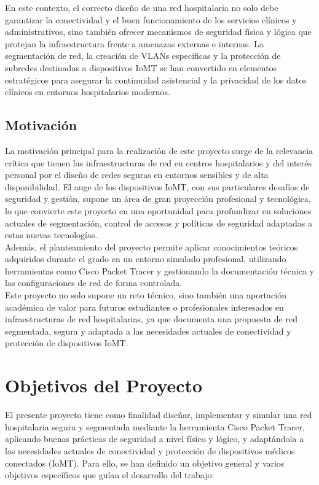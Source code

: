 En este contexto, el correcto diseño de una red hospitalaria no solo debe garantizar la conectividad y el buen funcionamiento de los servicios clínicos y administrativos, 
sino también ofrecer mecanismos de seguridad física y lógica que protejan la infraestructura frente a amenazas externas e internas. La segmentación de red, la creación de 
\ac{VLAN}s específicas y la protección de subredes destinadas a dispositivos IoMT se han convertido en elementos estratégicos para asegurar la continuidad asistencial y la 
privacidad de los datos clínicos en entornos hospitalarios modernos.

\subsection{Motivación}
La motivación principal para la realización de este proyecto surge de la relevancia crítica que tienen las infraestructuras de red en centros 
hospitalarios y del interés personal por el diseño de redes seguras en entornos sensibles y de alta disponibilidad. El auge de los dispositivos IoMT, con sus particulares 
desafíos de seguridad y gestión, supone un área de gran proyección profesional y tecnológica, lo que convierte este proyecto en una oportunidad para profundizar en soluciones 
actuales de segmentación, control de accesos y políticas de seguridad adaptadas a estas nuevas tecnologías. \\

Además, el planteamiento del proyecto permite aplicar conocimientos teóricos adquiridos durante el grado en un entorno simulado profesional, utilizando herramientas como 
Cisco Packet Tracer y gestionando la documentación técnica y las configuraciones de red de forma controlada. \\

Este proyecto no solo supone un reto técnico, sino también una aportación académica de valor para futuros estudiantes o profesionales interesados en infraestructuras de 
red hospitalarias, ya que documenta una propuesta de red segmentada, segura y adaptada a las necesidades actuales de conectividad y protección de dispositivos IoMT.

\section{Objetivos del Proyecto}
El presente proyecto tiene como finalidad diseñar, implementar y simular una red hospitalaria segura y segmentada mediante la herramienta Cisco Packet Tracer, aplicando buenas 
prácticas de seguridad a nivel físico y lógico, y adaptándola a las necesidades actuales de conectividad y protección de dispositivos médicos conectados (IoMT). Para ello, 
se han definido un objetivo general y varios objetivos específicos que guían el desarrollo del trabajo:

